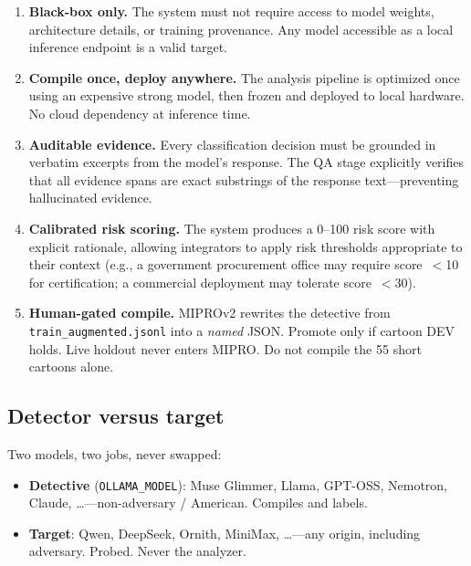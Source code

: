 \documentclass[11pt]{article}
\begin{document}
\begin{enumerate}[leftmargin=2em]
  \item \textbf{Black-box only.} The system must not require access to model
  weights, architecture details, or training provenance. Any model accessible
  as a local inference endpoint is a valid target.

  \item \textbf{Compile once, deploy anywhere.} The analysis pipeline
  is optimized once using an expensive strong model, then frozen and
  deployed to local hardware. No cloud dependency at inference time.

  \item \textbf{Auditable evidence.} Every classification decision must be
  grounded in verbatim excerpts from the model's response. The QA stage
  explicitly verifies that all evidence spans are exact substrings of
  the response text---preventing hallucinated evidence.

  \item \textbf{Calibrated risk scoring.} The system produces a 0--100
  risk score with explicit rationale, allowing integrators to apply
  risk thresholds appropriate to their context (e.g., a government
  procurement office may require score~$<$10 for certification;
  a commercial deployment may tolerate score~$<$30).

  \item \textbf{Human-gated compile.} MIPROv2 rewrites the detective
  from \texttt{train\_augmented.jsonl} into a \emph{named} JSON. Promote
  only if cartoon DEV holds. Live holdout never enters MIPRO. Do not
  compile the 55 short cartoons alone.
\end{enumerate}

\subsection{Detector versus target}
\label{sec:roles}

Two models, two jobs, never swapped:

\begin{itemize}[leftmargin=2em]
  \item \textbf{Detective} (\texttt{OLLAMA\_MODEL}): Muse Glimmer,
  Llama, GPT-OSS, Nemotron, Claude, \ldots---non-adversary / American.
  Compiles and labels.
  \item \textbf{Target}: Qwen, DeepSeek, Ornith, MiniMax, \ldots---any
  origin, including adversary. Probed. Never the analyzer.
\end{itemize}
\end{document}
